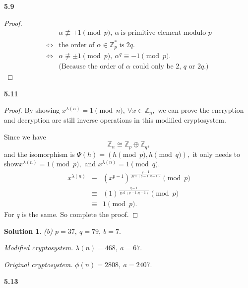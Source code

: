\documentclass[12pt,a4paper]{article}
\newcommand{\llra}{\Longleftrightarrow}
\theoremstyle{solution}
\newtheorem*{sol}{Solution}
\begin{document}
\textbf{5.9}

\begin{proof}
$$
\begin{array}{cl}
    & \alpha\nequiv \pm 1 \pmod p,~\alpha~\text{is~primitive~element~modulo }p\\
\Longleftrightarrow &
\text{the order of }\alpha \in \mathbb{Z}_p^* \text{ is } 2q.\\
\llra &
\alpha\nequiv \pm 1 \pmod p,~\alpha^q \equiv -1 \pmod p.\\
    &\text{(Because the order of $\alpha$ could only be 2, $q$ or $2q$.)}
\end{array}
$$
\end{proof}

\textbf{5.11}

\begin{proof}
By showing $x^{\lambda(n)} =1 \pmod n,~\forall x\in \mathbb{Z}_n,$ we can prove the encryption and decryption are still inverse operations in this modified cryptosystem.

Since we have
$$\mathbb{Z}_n \cong \mathbb{Z}_p \oplus \mathbb{Z}_q,$$
and the isomorphism is $\Psi (h)=(h\pmod{p},h\pmod{q}),$ it only needs to show$x^{\lambda(n)} =1 \pmod p,$ and $x^{\lambda(n)} =1 \pmod q.$
$$
\begin{array}{rcl}
x^{\lambda(n)}& \equiv &{(x^{p-1})}^{\frac{q-1}{\gcd (p-1,q-1)}}\pmod p\\
&\equiv &(1)^{\frac{q-1}{\gcd (p-1,q-1)}}\pmod p\\
&\equiv &1 \pmod p.
\end{array}
$$
For $q$ is the same. So complete the proof.
\end{proof}

\begin{sol}{\em (b)  }$p=37,~q=79,~b=7.$ \end{sol}

{\slshape Modified cryptosystem.} $\lambda (n)=468,~a=67.$

{\slshape Original cryptosystem.} $\phi (n)=2808,~a=2407.$

\textbf{5.13}
\end{document}
